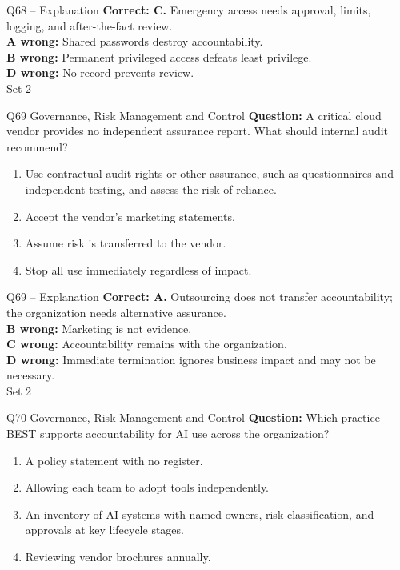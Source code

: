 \documentclass[aspectratio=169,10pt]{beamer}
\begin{document}
\begin{frame}[t]{Q68 -- Explanation}
	\footnotesize
	\textbf{Correct: C.} Emergency access needs approval, limits, logging, and after-the-fact review. \\[5pt]
\textbf{A wrong:} Shared passwords destroy accountability. \\[3pt]
\textbf{B wrong:} Permanent privileged access defeats least privilege. \\[3pt]
\textbf{D wrong:} No record prevents review. \\[3pt]
	\vfill {\tiny Set 2}
\end{frame}

\begin{frame}[t]{Q69 \hfill {\scriptsize Governance, Risk Management and Control}}
	\small
	\textbf{Question:} A critical cloud vendor provides no independent assurance report. What should internal audit recommend?
	\begin{enumerate}[label=\Alph*.,itemsep=1pt,topsep=3pt]
			\item Use contractual audit rights or other assurance, such as questionnaires and independent testing, and assess the risk of reliance.
			\item Accept the vendor's marketing statements.
			\item Assume risk is transferred to the vendor.
			\item Stop all use immediately regardless of impact.
	\end{enumerate}
\end{frame}

\begin{frame}[t]{Q69 -- Explanation}
	\footnotesize
	\textbf{Correct: A.} Outsourcing does not transfer accountability; the organization needs alternative assurance. \\[5pt]
\textbf{B wrong:} Marketing is not evidence. \\[3pt]
\textbf{C wrong:} Accountability remains with the organization. \\[3pt]
\textbf{D wrong:} Immediate termination ignores business impact and may not be necessary. \\[3pt]
	\vfill {\tiny Set 2}
\end{frame}

\begin{frame}[t]{Q70 \hfill {\scriptsize Governance, Risk Management and Control}}
	\small
	\textbf{Question:} Which practice BEST supports accountability for AI use across the organization?
	\begin{enumerate}[label=\Alph*.,itemsep=1pt,topsep=3pt]
			\item A policy statement with no register.
			\item Allowing each team to adopt tools independently.
			\item An inventory of AI systems with named owners, risk classification, and approvals at key lifecycle stages.
			\item Reviewing vendor brochures annually.
	\end{enumerate}
\end{frame}
\end{document}
